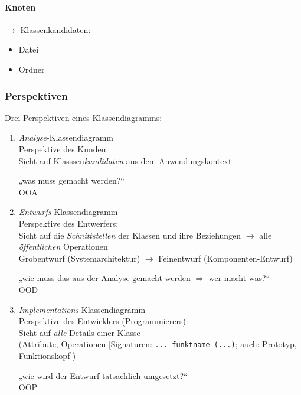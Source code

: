 \paragraph{Knoten} $\to$ Klassenkandidaten:
\begin{itemize}
	\item Datei
	\item Ordner
\end{itemize}

\subsubsection{Perspektiven}
Drei Perspektiven eines Klassendiagramms:
\begin{enumerate}
\item \emph{Analyse}-Klassendiagramm\\
Perspektive des Kunden:\\
Sicht auf Klasssen\emph{kandidaten} aus dem Anwendungskontext

„was muss gemacht werden?“\\
OOA
\item \emph{Entwurfs}-Klassendiagramm\\
Perspektive des Entwerfers:\\
Sicht auf die \emph{Schnittstellen} der Klassen und ihre Beziehungen $\to$ alle \emph{öffentlichen} Operationen\\
Grobentwurf (Systemarchitektur) $\to$ Feinentwurf (Komponenten-Entwurf)

„wie muss das aus der Analyse gemacht werden $\Rightarrow$ wer macht was?“\\
OOD
\item \emph{Implementations}-Klassendiagramm\\
Perspektive des Entwicklers (Programmierers):\\
Sicht auf \emph{alle} Details einer Klasse\\
(Attribute, Operationen [Signaturen: \lstinline$... funktname (...)$; auch: Prototyp, Funktionskopf])

„wie wird der Entwurf tatsächlich umgesetzt?“\\
OOP
\end{enumerate}

